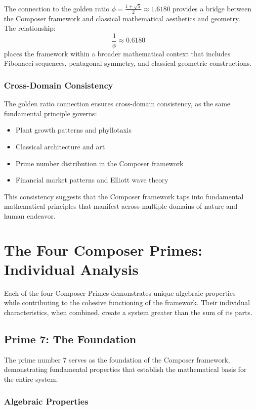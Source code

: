 \documentclass[12pt,a4paper]{report}
\begin{document}
The connection to the golden ratio $\phi = \frac{1 + \sqrt{5}}{2} \approx 1.6180$ provides a bridge between the Composer framework and classical mathematical aesthetics and geometry. The relationship:
\[
\frac{1}{\phi} \approx 0.6180
\]
places the framework within a broader mathematical context that includes Fibonacci sequences, pentagonal symmetry, and classical geometric constructions.

\subsection{Cross-Domain Consistency}

The golden ratio connection ensures cross-domain consistency, as the same fundamental principle governs:
\begin{itemize}
\item Plant growth patterns and phyllotaxis
\item Classical architecture and art
\item Prime number distribution in the Composer framework
\item Financial market patterns and Elliott wave theory
\end{itemize}

This consistency suggests that the Composer framework taps into fundamental mathematical principles that manifest across multiple domains of nature and human endeavor.

\chapter{The Four Composer Primes: Individual Analysis}

Each of the four Composer Primes demonstrates unique algebraic properties while contributing to the cohesive functioning of the framework. Their individual characteristics, when combined, create a system greater than the sum of its parts.

\section{Prime 7: The Foundation}

The prime number 7 serves as the foundation of the Composer framework, demonstrating fundamental properties that establish the mathematical basis for the entire system.

\subsection{Algebraic Properties}
\end{document}
